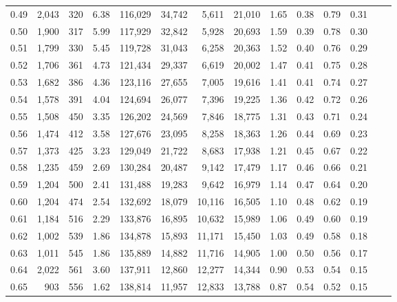 \begin{tabular}{rrrrrrrrrrrrrr}
0.49 &  2,043 &  320 &    6.38 &  116,029 &   34,742 &   5,611 &  21,010 &   1.65 &  0.38 &  0.79 &      0.31 \\
0.50 &  1,900 &  317 &    5.99 &  117,929 &   32,842 &   5,928 &  20,693 &   1.59 &  0.39 &  0.78 &      0.30 \\
0.51 &  1,799 &  330 &    5.45 &  119,728 &   31,043 &   6,258 &  20,363 &   1.52 &  0.40 &  0.76 &      0.29 \\
0.52 &  1,706 &  361 &    4.73 &  121,434 &   29,337 &   6,619 &  20,002 &   1.47 &  0.41 &  0.75 &      0.28 \\
0.53 &  1,682 &  386 &    4.36 &  123,116 &   27,655 &   7,005 &  19,616 &   1.41 &  0.41 &  0.74 &      0.27 \\
0.54 &  1,578 &  391 &    4.04 &  124,694 &   26,077 &   7,396 &  19,225 &   1.36 &  0.42 &  0.72 &      0.26 \\
0.55 &  1,508 &  450 &    3.35 &  126,202 &   24,569 &   7,846 &  18,775 &   1.31 &  0.43 &  0.71 &      0.24 \\
0.56 &  1,474 &  412 &    3.58 &  127,676 &   23,095 &   8,258 &  18,363 &   1.26 &  0.44 &  0.69 &      0.23 \\
0.57 &  1,373 &  425 &    3.23 &  129,049 &   21,722 &   8,683 &  17,938 &   1.21 &  0.45 &  0.67 &      0.22 \\
0.58 &  1,235 &  459 &    2.69 &  130,284 &   20,487 &   9,142 &  17,479 &   1.17 &  0.46 &  0.66 &      0.21 \\
0.59 &  1,204 &  500 &    2.41 &  131,488 &   19,283 &   9,642 &  16,979 &   1.14 &  0.47 &  0.64 &      0.20 \\
0.60 &  1,204 &  474 &    2.54 &  132,692 &   18,079 &  10,116 &  16,505 &   1.10 &  0.48 &  0.62 &      0.19 \\
0.61 &  1,184 &  516 &    2.29 &  133,876 &   16,895 &  10,632 &  15,989 &   1.06 &  0.49 &  0.60 &      0.19 \\
0.62 &  1,002 &  539 &    1.86 &  134,878 &   15,893 &  11,171 &  15,450 &   1.03 &  0.49 &  0.58 &      0.18 \\
0.63 &  1,011 &  545 &    1.86 &  135,889 &   14,882 &  11,716 &  14,905 &   1.00 &  0.50 &  0.56 &      0.17 \\
0.64 &  2,022 &  561 &    3.60 &  137,911 &   12,860 &  12,277 &  14,344 &   0.90 &  0.53 &  0.54 &      0.15 \\
0.65 &    903 &  556 &    1.62 &  138,814 &   11,957 &  12,833 &  13,788 &   0.87 &  0.54 &  0.52 &      0.15 \\

\end{tabular}
